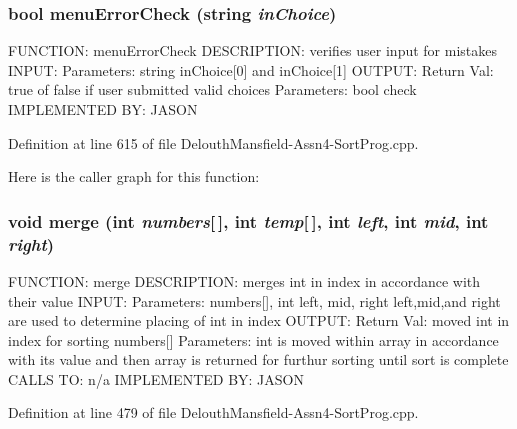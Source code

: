 \hypertarget{_delouth_mansfield-_assn4-_sort_prog_8cpp_a3fcd92b059e256a9f46866c6d1e2b1e4}{
\subsubsection[{menuErrorCheck}]{\setlength{\rightskip}{0pt plus 5cm}bool menuErrorCheck (string {\em inChoice})}}
\label{_delouth_mansfield-_assn4-_sort_prog_8cpp_a3fcd92b059e256a9f46866c6d1e2b1e4}
FUNCTION: menuErrorCheck DESCRIPTION: verifies user input for mistakes INPUT: Parameters: string inChoice\mbox{[}0\mbox{]} and inChoice\mbox{[}1\mbox{]} OUTPUT: Return Val: true of false if user submitted valid choices Parameters: bool check IMPLEMENTED BY: JASON 

Definition at line 615 of file DelouthMansfield-\/Assn4-\/SortProg.cpp.



Here is the caller graph for this function:

\hypertarget{_delouth_mansfield-_assn4-_sort_prog_8cpp_a22dd5c604dfcb67bc46bfd4bbb97d2f0}{
\subsubsection[{merge}]{\setlength{\rightskip}{0pt plus 5cm}void merge (int {\em numbers}\mbox{[}$\,$\mbox{]}, \/  int {\em temp}\mbox{[}$\,$\mbox{]}, \/  int {\em left}, \/  int {\em mid}, \/  int {\em right})}}
\label{_delouth_mansfield-_assn4-_sort_prog_8cpp_a22dd5c604dfcb67bc46bfd4bbb97d2f0}
FUNCTION: merge DESCRIPTION: merges int in index in accordance with their value INPUT: Parameters: numbers\mbox{[}\mbox{]}, int left, mid, right left,mid,and right are used to determine placing of int in index OUTPUT: Return Val: moved int in index for sorting numbers\mbox{[}\mbox{]} Parameters: int is moved within array in accordance with its value and then array is returned for furthur sorting until sort is complete CALLS TO: n/a IMPLEMENTED BY: JASON 

Definition at line 479 of file DelouthMansfield-\/Assn4-\/SortProg.cpp.



